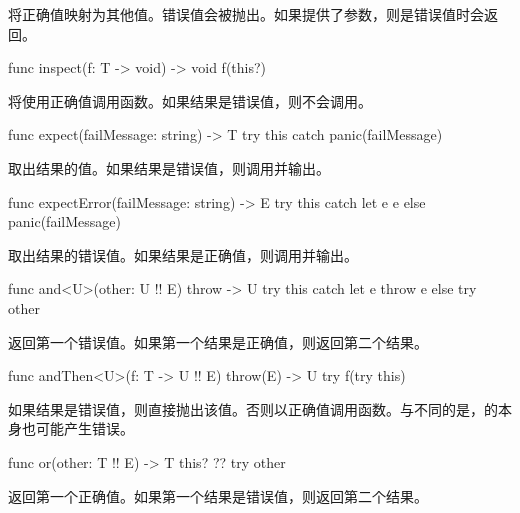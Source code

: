 \pnum
{}将正确值映射为其他值。错误值会被抛出。如果提供了参数，则是错误值时会返回。

\begin{itemdecl}
func inspect(f: T -> void) -> void {
    f(this?)
}
\end{itemdecl}

\pnum
{}将使用正确值调用函数。如果结果是错误值，则不会调用。

\begin{itemdecl}
func expect(failMessage: string) -> T {
    try this catch { panic(failMessage) }
}
\end{itemdecl}

\pnum
{}取出结果的值。如果结果是错误值，则调用并输出。

\begin{itemdecl}
func expectError(failMessage: string) -> E {
    try this catch let e { e } else { panic(failMessage) }
}
\end{itemdecl}

\pnum
{}取出结果的错误值。如果结果是正确值，则调用并输出。

\begin{itemdecl}
func and<U>(other: U !! E) throw -> U {
    try this catch let e { throw e } else { try other }
}
\end{itemdecl}

\pnum
{}返回第一个错误值。如果第一个结果是正确值，则返回第二个结果。

\begin{itemdecl}
func andThen<U>(f: T -> U !! E) throw(E) -> U {
    try f(try this)
}
\end{itemdecl}

\pnum
如果结果是错误值，则直接抛出该值。否则以正确值调用函数。\enternote 与不同的是，的本身也可能产生错误。\exitnote

\begin{itemdecl}
func or(other: T !! E) -> T {
    this? ?? try other
}
\end{itemdecl}

\pnum
{}返回第一个正确值。如果第一个结果是错误值，则返回第二个结果。

